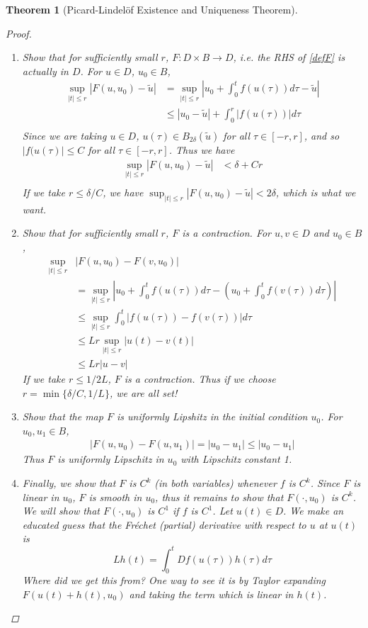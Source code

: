 \documentclass[12pt]{amsart}         %
\newtheorem{theorem}{Theorem}[section]
\theoremstyle{remark}
\begin{document}
\begin{theorem}[Picard-Lindel\"{o}f Existence and Uniqueness Theorem]
\begin{proof}
\begin{enumerate}
\item Show that for sufficiently small $r$, $F: D \times B \rightarrow D$, i.e. the RHS of \eqref{defF} is actually in $D$. For $u \in D$, $u_0 \in B$,
\begin{align*}
\sup_{|t| \leq r} |F(u, u_0) - \tilde{u}| &= 
\sup_{|t| \leq r} \left|u_0 + \int_0^t f(u(\tau)) d\tau - \tilde{u}\right| \\
&\leq |u_0 - \tilde{u}| + \int_0^r |f(u(\tau))| d \tau \\
\end{align*}
Since we are taking $u \in D$, $u(\tau) \in B_{2 \delta}(\tilde{u})$ for all $\tau \in [-r, r]$, and so $|f(u(\tau)| \leq C$ for all $\tau \in [-r, r]$. Thus we have
\begin{align*}
\sup_{|t| \leq r} |F(u, u_0) - \tilde{u}|
&< \delta + C r \\
\end{align*}
If we take $r \leq \delta/C$, we have $\sup_{|t| \leq r} |F(u, u_0) - \tilde{u}| < 2 \delta$, which is what we want.

\item Show that for sufficiently small $r$, $F$ is a contraction. For $u, v \in D$ and $u_0 \in B$, 
\begin{align*}
\sup_{|t|\leq r}&|F(u, u_0) - F(v, u_0)| \\
&=\sup_{|t|\leq r} \left| u_0 + \int_0^t f(u(\tau)) d \tau - \left(u_0 + \int_0^t f(v(\tau)) d \tau \right) \right| \\
&\leq \sup_{|t|\leq r} \int_0^t | f(u(\tau)) - f(v(\tau))| d \tau \\
&\leq L r \sup_{|t|\leq r} |u(t) - v(t)| \\
&\leq L r |u - v|
\end{align*}
If we take $r \leq 1/2L$, $F$ is a contraction. Thus if we choose $r = \min\{ \delta/C, 1/L\}$, we are all set!

\item Show that the map $F$ is uniformly Lipshitz in the initial condition $u_0$. For $u_0, u_1 \in B$,
\begin{align*}
|F(u, u_0) - F(u, u_1)| = |u_0 - u_1| \leq |u_0 - u_1|
\end{align*} 
Thus $F$ is uniformly Lipschitz in $u_0$ with Lipschitz constant 1.

\item Finally, we show that $F$ is $C^k$ (in both variables) whenever $f$ is $C^k$. Since $F$ is linear in $u_0$, $F$ is smooth in $u_0$, thus it remains to show that $F(\cdot, u_0)$ is $C^k$. We will show that $F(\cdot, u_0)$ is $C^1$ if $f$ is $C^1$. Let $u(t) \in D$. We make an educated guess that the Fr\'{e}chet (partial) derivative with respect to $u$ at $u(t)$ is 
\[
L h(t) = \int_0^t Df(u(\tau)) h(\tau) d \tau
\]
Where did we get this from? One way to see it is by Taylor expanding $F(u(t) + h(t), u_0)$ and taking the term which is linear in $h(t)$. 


\end{enumerate}
\end{proof}
\end{theorem}
\end{document}
